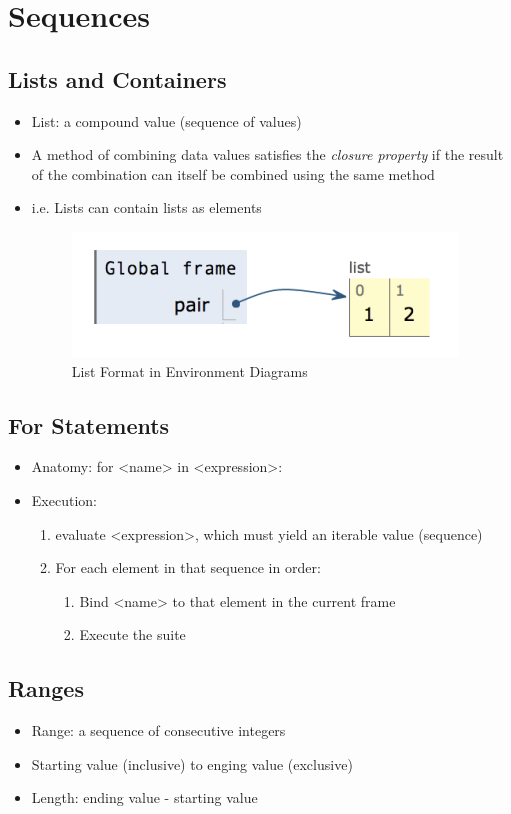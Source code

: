 \chapter{Sequences}

\section{Lists and Containers}
\begin{itemize}
    \item List: a compound value (sequence of values)
    \item A method of combining data values satisfies the \emph{closure property} if the result of the combination can itself be combined using the same method
    \item i.e. Lists can contain lists as elements
    \medskip
	\begin{figure}[H]
	\includegraphics[width=0.5\linewidth]{figures/env_diagram_list.png}
	\caption{List Format in Environment Diagrams}
	\end{figure}
\end{itemize}

\section{For Statements}
\begin{itemize}
    \item Anatomy: for <name> in <expression>:
    \item Execution:
    \begin{enumerate}
        \item evaluate <expression>, which must yield an iterable value (sequence)
        \item For each element in that sequence in order: 
        \begin{enumerate}
            \item Bind <name> to that element in the current frame
            \item Execute the suite
        \end{enumerate}
    \end{enumerate}
\end{itemize}

\section{Ranges}
\begin{itemize}
    \item Range: a sequence of consecutive integers
    \item Starting value (inclusive) to enging value (exclusive)
    \item Length: ending value - starting value
\end{itemize}

